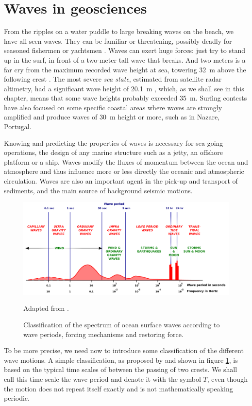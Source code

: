 \section{Waves in geosciences}
From the ripples on a water puddle to large breaking waves on the beach, we have all seen waves. 
They can be familiar or threatening, possibly deadly for seasoned fishermen or yachtsmen 
\citep[e. g. ][]{Pierson1972,Greenslade2001b}. Waves can exert huge forces: just try to stand up in the surf,
in front of a two-meter tall wave that breaks. And two meters is a far cry from the maximum recorded wave height at sea, towering
32~m above the following crest \citep{Liu&al.2008b}. The most severe \textit{sea state}, estimated from satellite radar altimetry, had a significant 
wave height of 20.1~m \citep{Hanafin&al.2012}, which, as we shall see in this chapter, 
means that some wave heights probably exceeded 35~m. Surfing contests have also focused on some specific coastal areas where waves are strongly amplified and produce waves of 30~m height or more, such as in Nazare, Portugal.

Knowing and predicting the properties of waves is necessary for sea-going operations, the design of any marine structure such as 
a jetty, an offshore platform or a ship. 
Waves modify the fluxes of momentum between the ocean and atmosphere and thus influence more or less directly the oceanic and 
atmospheric circulation. Waves are also an important agent in the pick-up and transport of sediments, and 
the main source of background seismic motions. 

\begin{figure}[htb]
\centerline{\includegraphics[width=\textwidth]{FIGS_CH_INTRO/Munk_ICCE_1950_Fig1.pdf}}
  \caption{Classification of the spectrum of ocean surface waves according to wave periods, forcing mechanisms and restoring force.}{Adapted from \cite{Munk1950}.}
\label{fig:Munk1950}
\end{figure}
To be more precise, we need now to introduce some classification of the different wave motions. A simple classification, as proposed by 
\cite{Munk1950} and shown in figure \ref{fig:Munk1950}, is based on the typical time scales of between the passing of two crests. We shall call this time scale the wave period and denote it with the symbol $T$, even though the motion does not repeat itself exactly and is not mathematically speaking periodic. 

